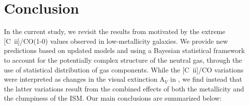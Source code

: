\documentclass{aa}
\newcommand{\cii}{[C~{\sc ii}]}
\begin{document}
\section{Conclusion}
\label{section_conclusion}
In the current study, we revisit the results from  motivated by the extreme \cii /CO(1-0) values observed in low-metallicity galaxies. We provide new predictions based on updated models and using a Bayesian statistical framework to account for the potentially complex structure of the neutral gas, through the use of statistical distribution of gas components. While the \cii/CO variations were interpreted as changes in the visual extinction A$_V$ in , we find instead that the latter variations result from the combined effects of both the metallicity and the clumpiness of the ISM. Our main conclusions are summarized below:
\end{document}

